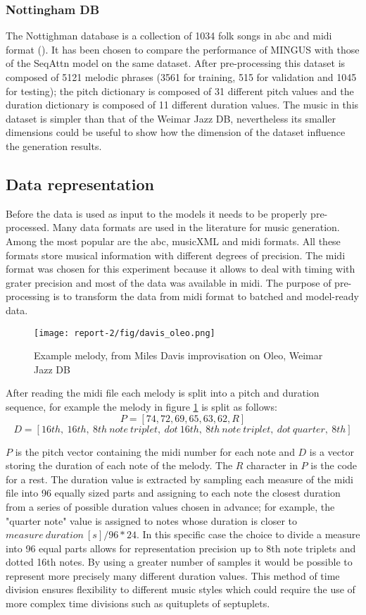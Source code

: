\documentclass{article}
\begin{document}
\subsubsection{Nottingham DB}
The Nottighman database is a collection of 1034 folk songs in abc and midi format (\cite{NottinghamDB}). It has been chosen to compare the performance of MINGUS with those of the SeqAttn model on the same dataset. After pre-processing this dataset is composed of 5121 melodic phrases (3561 for training, 515 for validation and 1045 for testing); the pitch dictionary is composed of 31 different pitch values and the duration dictionary is composed of 11 different duration values. The music in this dataset is simpler than that of the Weimar Jazz DB, nevertheless its smaller dimensions could be useful to show how the dimension of the dataset influence the generation results.

\subsection{Data representation}
Before the data is used as input to the models it needs to be properly pre-processed. Many data formats are used in the literature for music generation. Among the most popular are the abc, musicXML and midi formats. All these formats store musical information with different degrees of precision. The midi format was chosen for this experiment because it allows to deal with timing with grater precision and most of the data was available in midi. The purpose of pre-processing is to transform the data from midi format to batched and model-ready data. 

\begin{figure}[!ht]
    \centering
    \texttt{[image: report-2/fig/davis\_oleo.png]}
    \caption{Example melody, from Miles Davis improvisation on Oleo, Weimar Jazz DB} 
    \label{fig:Davis oleo}
\end{figure}

After reading the midi file each melody is split into a pitch and duration sequence, for example the melody in figure \ref{fig:Davis oleo} is split as follows:
\[P = [ 74, 72, 69, 65, 63, 62, R ] \]
\[D = [16th,\ 16th,\ 8th \ note \ triplet,\ dot \ 16th,\ 8th \ note \ triplet,\ dot \ quarter,\ 8th ]\]

$P$ is the pitch vector containing the midi number for each note and $D$ is a vector storing the duration of each note of the melody. The $R$ character in $P$ is the code for a rest. The duration value is extracted by sampling each measure of the midi file into 96 equally sized parts and assigning to each note the closest duration from a series of possible duration values chosen in advance; for example, the "quarter note" value is assigned to notes whose duration is closer to $measure \ duration \ [s] / 96 * 24$. In this specific case the choice to divide a measure into 96 equal parts allows for representation precision up to 8th note triplets and dotted 16th notes. By using a greater number of samples it would be possible to represent more precisely many different duration values. This method of time division ensures flexibility to different music styles which could require the use of more complex time divisions such as quituplets of septuplets. 
\end{document}
